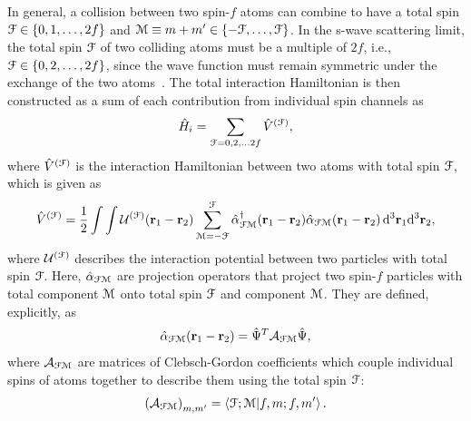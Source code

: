In general, a collision between two spin-\(f\) atoms can combine to have a total
spin \(\EuScript{F} \in \{0, 1, \ldots, 2f\}\) and
\(\EuScript{M} \equiv m + m' \in \{-\EuScript{F}, \ldots, \EuScript{F}\}\).
In the s-wave scattering limit, the total spin \(\EuScript{F}\) of two colliding
atoms must be a multiple of \(2f\), i.e., \(\EuScript{F} \in
\{0, 2, \ldots, 2f\}\), since the wave function must remain symmetric under the
exchange of the two atoms~\cite{Pethick2008}.
The total interaction Hamiltonian is then constructed as a sum of each
contribution from individual spin channels as~\cite{Kawaguchi2012}
\begin{align}
    \hat{H}_i = \sum_{\EuScript{F}=0, 2, \ldots 2f} \hat{V}^{(\EuScript{F})},
\end{align}
where \(\hat{V}^{(\EuScript{F})}\) is the interaction Hamiltonian between two
atoms with total spin \(\EuScript{F}\), which is given as
\begin{align}\label{eq: spin-channel-hamiltonian-full-form}
    \hat{V}^{(\EuScript{F})} = \frac{1}{2}\int\int
    \mathcal{U}^{(\EuScript{F})}(\vb{r}_1-\vb{r}_2)
    \sum_{\EuScript{M}=-\EuScript{F}}^{\EuScript{F}}
    \hat{\alpha}^\dagger_{\EuScript{F}\EuScript{M}}(\vb{r}_1-\vb{r}_2)
    \hat{\alpha}_{\EuScript{F}\EuScript{M}}(\vb{r}_1-\vb{r}_2) \,
    \dd^3\vb{r}_1\dd^3\vb{r}_2,
\end{align} 
where \(\mathcal{U}^{(\EuScript{F})}\) describes the interaction potential
between two particles with total spin \(\EuScript{F}\).
Here, \(\hat{\alpha}_{\EuScript{F}\EuScript{M}}\) are projection operators
that project two spin-\(f\) particles with total component \(\EuScript{M}\)
onto total spin \(\EuScript{F}\) and component \(\EuScript{M}\).
They are defined, explicitly, as
\begin{align}
    \hat{\alpha}_{\EuScript{F}\EuScript{M}}(\vb{r}_1-\vb{r}_2) =
    \hat{\Psi}^T\mathcal{A}_{\EuScript{F}\EuScript{M}}\hat{\Psi},
\end{align}
where \(\mathcal{A}_{\EuScript{F}\EuScript{M}}\) are matrices of
Clebsch-Gordon coefficients which couple individual spins of atoms together
to describe them using the total spin \(\EuScript{F}\):
\begin{align}
    {\left(\mathcal{A}_{\EuScript{F}\EuScript{M}}\right)}_{m,m'} =
    \braket{\EuScript{F}; \EuScript{M}}{f, m; f, m'}.
\end{align}

